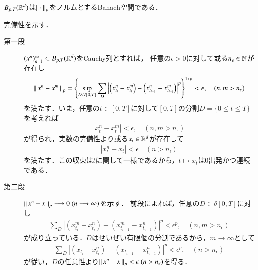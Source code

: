\begin{screen}
	\begin{thm}
		$B_{p,T}(\mathbb{R}^d)$は$\left\|\, \cdot\, \right\|_{p}$をノルムとするBanach空間である．
	\end{thm}
\end{screen}

\begin{prf}完備性を示す．
	\begin{description}
		\item[第一段] $(x^n)_{n=1}^{\infty} \subset B_{p,T}(\mathbb{R}^d)$をCauchy列とすれば，
			任意の$\epsilon > 0$に対して或る$n_\epsilon \in \mathbb{N}$が存在し
			\begin{align}
				\left\|\, x^n - x^m\, \right\|_{p}
				= \left\{ \operatorname*{sup}_{D \in \delta[0,T]} \sum_{D} 
				\left| \left( x^n_{t_i} - x^m_{t_i} \right) 
				- \left(x^n_{t_{i-1}} - x^m_{t_{i-1}} \right) \right|^p \right\}^{1/p} < \epsilon,
				\quad (n,m > n_\epsilon)
			\end{align}
			を満たす．いま，任意の$t \in [0,T]$に対して$[0,T]$の分割$D = \{0 \leq t \leq T\}$
			を考えれば
			\begin{align}
				|x^n_t - x^m_t| < \epsilon,
				\quad (n,m > n_\epsilon)
			\end{align}
			が得られ，実数の完備性より或る$x_t \in \mathbb{R}^d$が存在して
			\begin{align}
				|x^n_t - x_t| < \epsilon
				\quad (n > n_\epsilon)
			\end{align}
			を満たす．この収束は$t$に関して一様であるから，$t \longmapsto x_t$は0出発かつ連続である．
			
		\item[第二段] $\left\|\, x^n - x\, \right\|_{p} \longrightarrow 0\ (n \longrightarrow \infty)$を示す．
			前段によれば，任意の$D \in \delta[0,T]$に対し
			\begin{align}
				\sum_D \left| (x^m_{t_i} - x^n_{t_i}) - (x^m_{t_{i-1}} - x^n_{t_{i-1}}) \right|^p
				< \epsilon^p,
				\quad (n,m > n_\epsilon)
			\end{align}
			が成り立っている．$D$はせいぜい有限個の分割であるから，$m \longrightarrow \infty$として
			\begin{align}
				\sum_D \left| (x_{t_i} - x^n_{t_i}) - (x_{t_{i-1}} - x^n_{t_{i-1}}) \right|^p
				< \epsilon^p,
				\quad (n > n_\epsilon)
			\end{align}
			が従い，$D$の任意性より$\left\|\, x^n - x\, \right\|_{p} < \epsilon\ (n > n_\epsilon)$を得る．
			\QED
	\end{description}
\end{prf}

